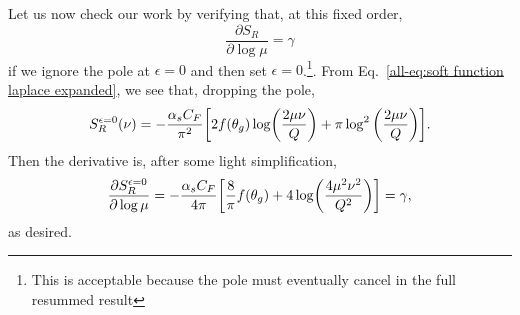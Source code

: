 \documentclass[../thesis.tex]{subfiles}
\begin{document}
	Let us now check our work by verifying that, at this fixed order,
	\begin{equation}
		\frac{\partial S_R}{\partial \log \mu} = \gamma
	\end{equation}
	if we ignore the pole at $\epsilon = 0$ and then set $\epsilon = 0$.\footnote{This is acceptable because the pole must eventually cancel in the full resummed result}. From Eq.~\ref{all-eq:soft function laplace expanded}, we see that, dropping the pole,
	\begin{equation}
		S_R^{\epsilon=0}(\nu) = -\frac{\alpha_s C_F}{\pi^2} \qty[2f(\theta_g)\log(\frac{2\mu\nu}{Q}) + \pi\log^2\qty(\frac{2\mu\nu}{Q})].
	\end{equation}
	Then the derivative is, after some light simplification,
	\begin{equation}
		\frac{\partial S_R^{\epsilon=0}}{\partial \log \mu} = -\frac{\alpha_s C_F}{4\pi}\qty[\frac{8}{\pi}f(\theta_g) + 4\log(\frac{4\mu^2\nu^2}{Q^2})] = \gamma,
	\end{equation}
	as desired.
\end{document}
